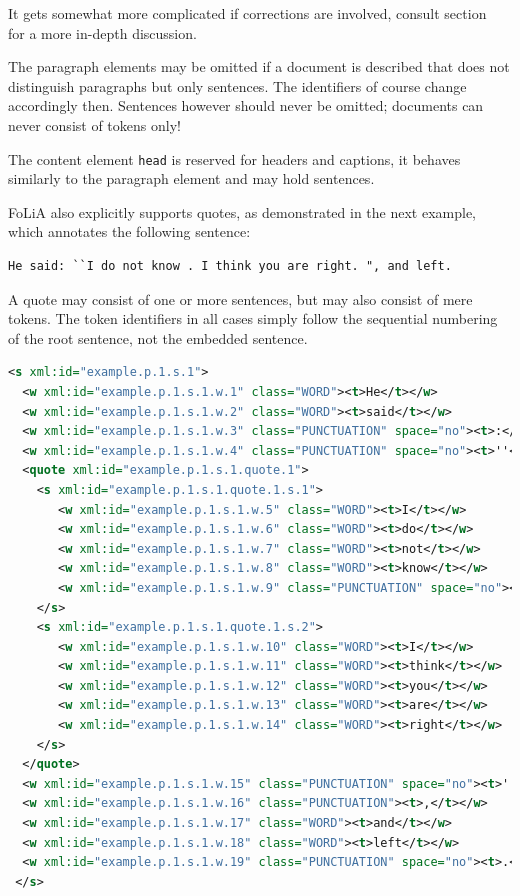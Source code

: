 \documentclass[a4paper,12pt]{report}
\begin{document}
It gets somewhat more complicated if corrections are involved, consult section~\label{sec:textcontent} for a more in-depth discussion.

The paragraph elements may be omitted if a document is described that does not distinguish paragraphs but only sentences. The identifiers of course change accordingly then. Sentences however should never be omitted; documents can never consist of tokens only!

The content element \texttt{head} is reserved for headers and captions, it behaves similarly to the paragraph element and may hold sentences.


FoLiA also explicitly supports quotes, as demonstrated in the next example, which annotates the following sentence: 

\begin{verbatim}
He said: ``I do not know . I think you are right. ", and left.
\end{verbatim}

 A quote may consist of one or more sentences, but may also consist of mere tokens. The token identifiers in all cases simply follow the sequential numbering of the root sentence, not the embedded sentence.


\begin{lstlisting}[language=xml]
 <s xml:id="example.p.1.s.1">
  <w xml:id="example.p.1.s.1.w.1" class="WORD"><t>He</t></w>
  <w xml:id="example.p.1.s.1.w.2" class="WORD"><t>said</t></w>
  <w xml:id="example.p.1.s.1.w.3" class="PUNCTUATION" space="no"><t>:</t></w>
  <w xml:id="example.p.1.s.1.w.4" class="PUNCTUATION" space="no"><t>''</t></w>
  <quote xml:id="example.p.1.s.1.quote.1">
    <s xml:id="example.p.1.s.1.quote.1.s.1">
       <w xml:id="example.p.1.s.1.w.5" class="WORD"><t>I</t></w>
       <w xml:id="example.p.1.s.1.w.6" class="WORD"><t>do</t></w>
       <w xml:id="example.p.1.s.1.w.7" class="WORD"><t>not</t></w>
       <w xml:id="example.p.1.s.1.w.8" class="WORD"><t>know</t></w>
       <w xml:id="example.p.1.s.1.w.9" class="PUNCTUATION" space="no"><t>.</t></w>
    </s>
    <s xml:id="example.p.1.s.1.quote.1.s.2">
       <w xml:id="example.p.1.s.1.w.10" class="WORD"><t>I</t></w>
       <w xml:id="example.p.1.s.1.w.11" class="WORD"><t>think</t></w>
       <w xml:id="example.p.1.s.1.w.12" class="WORD"><t>you</t></w>
       <w xml:id="example.p.1.s.1.w.13" class="WORD"><t>are</t></w>
       <w xml:id="example.p.1.s.1.w.14" class="WORD"><t>right</t></w>
    </s>
  </quote>
  <w xml:id="example.p.1.s.1.w.15" class="PUNCTUATION" space="no"><t>''</t></w>
  <w xml:id="example.p.1.s.1.w.16" class="PUNCTUATION"><t>,</t></w>
  <w xml:id="example.p.1.s.1.w.17" class="WORD"><t>and</t></w>
  <w xml:id="example.p.1.s.1.w.18" class="WORD"><t>left</t></w>
  <w xml:id="example.p.1.s.1.w.19" class="PUNCTUATION" space="no"><t>.</t></w>
 </s>
\end{lstlisting}
\end{document}
